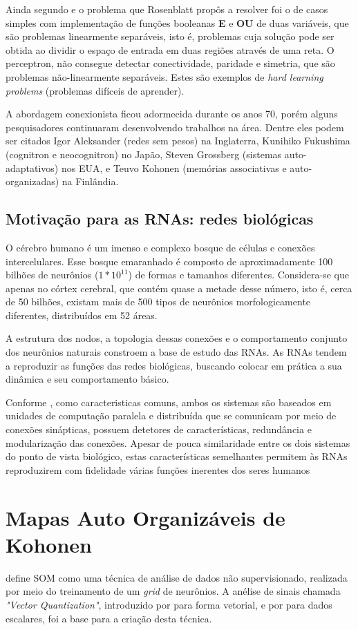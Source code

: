 \documentclass[
	12pt,				%
	openright,			%
	twoside,			%
	a4paper,			%
	english,			%
	french,				%
	spanish,			%
	brazil				%
	]{abntex2}
\begin{document}
Ainda segundo  e  o problema que Rosenblatt propôs a resolver foi o de casos simples com implementação de funções booleanas \textbf{E} e \textbf{OU} de duas variáveis, que são problemas linearmente separáveis, isto é, problemas cuja solução pode ser obtida ao dividir o espaço de entrada em duas regiões através de uma reta. O perceptron, não consegue detectar conectividade, paridade e simetria, que são problemas não-linearmente separáveis. Estes são exemplos de \textit{hard learning problems} (problemas difíceis de aprender).

A abordagem conexionista ficou adormecida durante os anos 70, porém alguns pesquisadores continuaram desenvolvendo trabalhos na área. Dentre eles podem ser citados Igor Aleksander (redes sem pesos) na Inglaterra, Kunihiko Fukushima (cognitron e neocognitron) no Japão, Steven Grossberg (sistemas auto-adaptativos) nos EUA, e Teuvo Kohonen (memórias associativas e auto-organizadas) na Finlândia.

\subsection{Motivação para as RNAs: redes biológicas}
O cérebro humano é um imenso e complexo bosque de células e conexões intercelulares. Esse bosque emaranhado é composto de aproximadamente 100 bilhões de neurônios ($ 1 * 10^{11}$) de formas e tamanhos diferentes. Considera-se que apenas no córtex cerebral, que contém quase a metade desse número, isto é, cerca de 50 bilhões, existam mais de 500 tipos de neurônios morfologicamente diferentes, distribuídos em 52 áreas.\cite[p.18]{mora2016continuum} 

A estrutura dos nodos, a topologia dessas conexões e o comportamento conjunto dos neurônios naturais constroem a base de estudo das RNAs. As RNAs tendem a reproduzir as funções das redes biológicas, buscando colocar em prática a sua dinâmica e seu comportamento básico. 

Conforme , como caracteristicas comuns, ambos os sistemas são baseados em unidades de computação paralela e distribuída que se comunicam por meio de conexões sinápticas, possuem detetores de características, redundância e modularização das conexões. Apesar de pouca similaridade entre os dois sistemas do ponto de vista biológico, estas características semelhantes permitem às RNAs reproduzirem com fidelidade várias funções inerentes dos seres humanos
\section{Mapas Auto Organizáveis de Kohonen}
 define SOM como uma técnica de análise de dados não supervisionado, realizada por meio do treinamento de um \emph{grid} de neurônios. A anélise de sinais chamada \emph{"Vector Quantization"}, introduzido por  para forma vetorial, e por  para dados escalares, foi a base para a criação desta técnica. 
\end{document}
